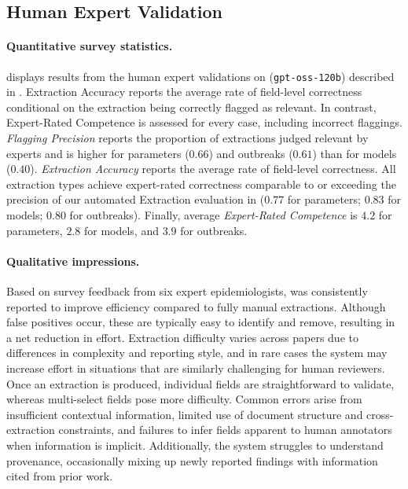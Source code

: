 \subsection{Human Expert Validation}\label{sec:human_expert_validation}

\paragraph{Quantitative survey statistics.}
displays results from the human expert validations on \name{} (\texttt{gpt-oss-120b}) described in .
Extraction Accuracy reports the average rate of field-level correctness conditional on the extraction being correctly flagged as relevant. In contrast, Expert-Rated Competence is assessed for every case, including incorrect flaggings.
\textit{Flagging Precision} reports the proportion of \name{} extractions judged relevant by experts and is higher for parameters ($0.66$) and outbreaks ($0.61$) than for models ($0.40$). \textit{Extraction Accuracy} reports the average rate of field-level correctness. All extraction types achieve expert-rated correctness comparable to or exceeding the precision of our automated Extraction evaluation in  ($0.77$ for parameters; $0.83$ for models; $0.80$ for outbreaks). Finally, average \textit{Expert-Rated Competence} is $4.2$ for parameters, $2.8$ for models, and $3.9$ for outbreaks.

\paragraph{Qualitative impressions.}
Based on survey feedback from six expert epidemiologists, \name{} was consistently reported to improve efficiency compared to fully manual extractions. Although false positives occur, these are typically easy to identify and remove, resulting in a net reduction in effort. Extraction difficulty varies across papers due to differences in complexity and reporting style, and in rare cases the system may increase effort in situations that are similarly challenging for human reviewers. Once an extraction is produced, individual fields are straightforward to validate, whereas multi-select fields pose more difficulty. Common errors arise from insufficient contextual information, limited use of document structure and cross-extraction constraints, and failures to infer fields apparent to human annotators when information is implicit. Additionally, the system struggles to understand provenance, occasionally mixing up newly reported findings with information cited from prior work.

